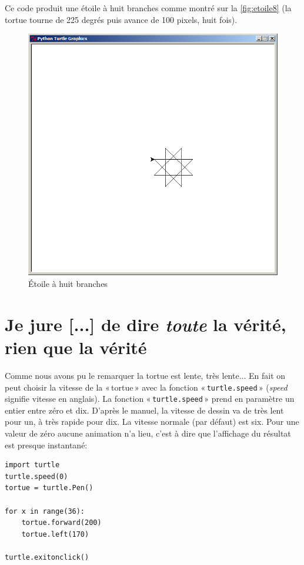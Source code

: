 Ce code produit une étoile à huit branches comme montré sur la \autoref{fig:etoile8} (la tortue tourne de 225 degrés puis avance de 100 pixels, huit fois).
\begin{figure}[h!]
\centering
\includegraphics[scale=0.4]{images/etoile8}
\caption{Étoile à huit branches}\label{fig:etoile8}
\end{figure}


\section{Je jure [...] de dire \emph{toute} la vérité, rien que la vérité}

Comme nous avons pu le remarquer la tortue est lente, très lente... En fait on peut choisir la vitesse de la « tortue » avec la fonction « \texttt{turtle.speed} » (\emph{speed} signifie vitesse en anglais). La fonction « \texttt{turtle.speed} » prend en paramètre un entier entre zéro et dix. D'après le manuel, la vitesse de dessin va de très lent pour un, à très rapide pour dix. La vitesse normale (par défaut) est six. Pour une valeur de zéro aucune animation n'a lieu, c'est à dire que l'affichage du résultat est presque instantané:

\begin{Verbatim}[frame=single,rulecolor=\color{mbleu}, label=à taper]
import turtle
turtle.speed(0)
tortue = turtle.Pen()

for x in range(36):
    tortue.forward(200)
    tortue.left(170)
    
turtle.exitonclick()
\end{Verbatim}

